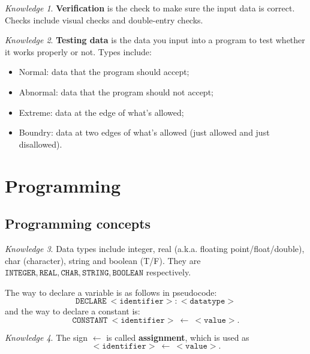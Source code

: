 \documentclass[8pt]{article}
\theoremstyle{remark}
\newtheorem{knowledge}{Knowledge}[subsection]
\begin{document}
        \begin{knowledge}
            \textbf{Verification} is the check to make sure the input data is correct. Checks include visual checks and double-entry checks.
        \end{knowledge}

        \begin{knowledge}
            \textbf{Testing data} is the data you input into a program to test whether it works properly or not. Types include:
            \begin{itemize}
                \item Normal: data that the program should accept;
                \item Abnormal: data that the program should not accept;
                \item Extreme: data at the edge of what's allowed;
                \item Boundry: data at two edges of what's allowed (just allowed and just disallowed).
            \end{itemize}
        \end{knowledge}

    \section{Programming}
        \subsection{Programming concepts}
            \begin{knowledge}
                Data types include integer, real (a.k.a. floating point/float/double), char (character), string and boolean (T/F). They are \(\mathtt{INTEGER}, \mathtt{REAL}, \mathtt{CHAR}, \mathtt{STRING}, \mathtt{BOOLEAN}\) respectively.

                The way to declare a variable is as follows in pseudocode:
                \[
                    \mathtt{DECLARE\ <identifier>:<datatype>}
                \]
                and the way to declare a constant is:
                \[
                    \mathtt{CONSTANT\ <identifier>\ \leftarrow\ <value>}.
                \]
            \end{knowledge}
        
            \begin{knowledge}
                The sign $\leftarrow$ is called \textbf{assignment}, which is used as
                \[
                    \mathtt{<identifier>\ \leftarrow\ <value>}.
                \]
            \end{knowledge}
\end{document}
